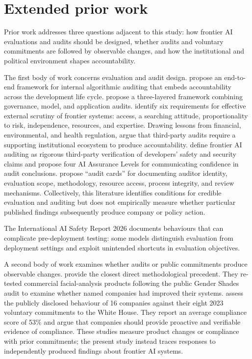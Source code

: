 \documentclass{article}
\begin{document}
\section{Extended prior work}\label{app:prior}
Prior work addresses three questions adjacent to this study: how frontier AI evaluations and audits should be designed, whether audits and voluntary commitments are followed by observable changes, and how the institutional and political environment shapes accountability.

The first body of work concerns evaluation and audit design. \citet{raji2020} propose an end-to-end framework for internal algorithmic auditing that embeds accountability across the development life cycle. \citet{mokander2023} propose a three-layered framework combining governance, model, and application audits. \citet{anderljung2023} identify six requirements for effective external scrutiny of frontier systems: access, a searching attitude, proportionality to risk, independence, resources, and expertise. Drawing lessons from financial, environmental, and health regulation, \citet{raji2022} argue that third-party audits require a supporting institutional ecosystem to produce accountability. \citet{brundage2026} define frontier AI auditing as rigorous third-party verification of developers' safety and security claims and propose four AI Assurance Levels for communicating confidence in audit conclusions. \citet{staufer2025} propose ``audit cards'' for documenting auditor identity, evaluation scope, methodology, resource access, process integrity, and review mechanisms. Collectively, this literature identifies conditions for credible evaluation and auditing but does not empirically measure whether particular published findings subsequently produce company or policy action.

The International AI Safety Report 2026 \citep{bengio2026} documents behaviours that can complicate pre-deployment testing: some models distinguish evaluation from deployment settings and exploit unintended shortcuts in evaluation objectives.

A second body of work examines whether audits or public commitments produce observable changes. \citet{raji2019} provide the closest direct methodological precedent. They re-tested commercial facial-analysis products following the public Gender Shades audit to examine whether named companies had improved their systems. \citet{wang2025} assess the publicly disclosed behaviour of 16 companies against their eight 2023 voluntary commitments to the White House. They report an average compliance score of 53\% and argue that companies should provide proactive and verifiable evidence of compliance. These studies measure product changes or compliance with prior commitments; the present study instead traces responses to independently produced findings about frontier AI systems.
\end{document}
